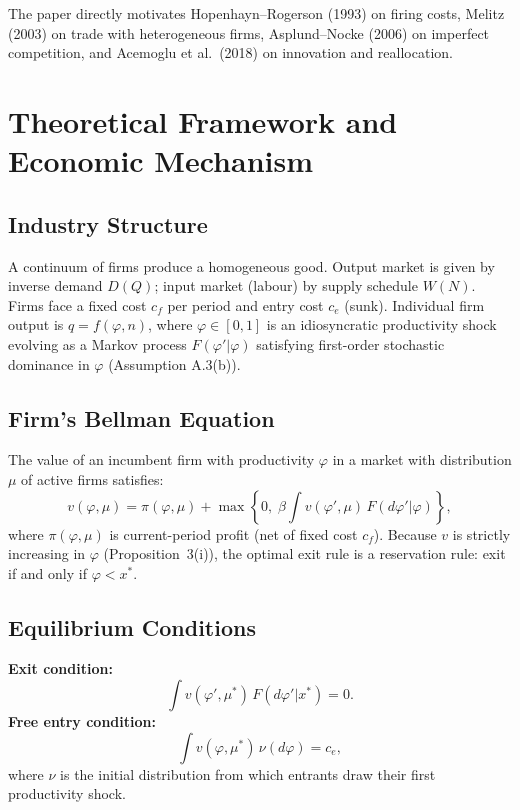 The paper directly motivates Hopenhayn--Rogerson (1993) on firing costs,
Melitz (2003) on trade with heterogeneous firms, Asplund--Nocke (2006) on
imperfect competition, and Acemoglu et al.\ (2018) on innovation and
reallocation.

\section{Theoretical Framework and Economic Mechanism}

\subsection*{Industry Structure}

A continuum of firms produce a homogeneous good. Output market is given by
inverse demand $D(Q)$; input market (labour) by supply schedule $W(N)$.
Firms face a fixed cost $c_f$ per period and entry cost $c_e$ (sunk).
Individual firm output is $q=f(\varphi,n)$, where $\varphi \in [0,1]$ is an
idiosyncratic productivity shock evolving as a Markov process
$F(\varphi'|\varphi)$ satisfying first-order stochastic dominance in $\varphi$
(Assumption A.3(b)).

\subsection*{Firm's Bellman Equation}

The value of an incumbent firm with productivity $\varphi$ in a market with
distribution $\mu$ of active firms satisfies:
\begin{equation}
  v(\varphi,\mu) = \pi(\varphi,\mu)
    + \max\!\left\{0,\; \beta\int v(\varphi',\mu)\,F(d\varphi'|\varphi)\right\},
  \label{eq:hop_bellman}
\end{equation}
where $\pi(\varphi,\mu)$ is current-period profit (net of fixed cost $c_f$).
Because $v$ is strictly increasing in $\varphi$ (Proposition~3(i)), the
optimal exit rule is a reservation rule: exit if and only if
$\varphi < x^{*}$.

\subsection*{Equilibrium Conditions}

\textbf{Exit condition:}
\begin{equation}
  \int v(\varphi',\mu^*)\,F(d\varphi'|x^*) = 0.
  \label{eq:hop_exit}
\end{equation}
\textbf{Free entry condition:}
\begin{equation}
  \int v(\varphi,\mu^*)\,\nu(d\varphi) = c_e,
  \label{eq:hop_entry}
\end{equation}
where $\nu$ is the initial distribution from which entrants draw their
first productivity shock.

